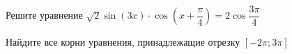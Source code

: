\begin{ex}
	\begin{condition}
		\begin{enumcols}[label=\asbuk*)]
			\item Решите уравнение \(  \sqrt{2}\sin{(3x)}\cdot\cos{\left(x + \dfrac{\pi}{4}\right)} = 2\cos{\dfrac{3\pi}{4}}  \)
			\item Найдите все корни уравнения, принадлежащие отрезку \(  \left[-2\pi;3\pi\right] \)
		\end{enumcols}
	\end{condition}
\end{ex}